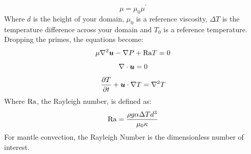 \begin{equation*}
\mu = \mu_{0} \mu^\prime
\end{equation*}
Where $d$ is the height of your domain, $\mu_{0}$ is a reference viscosity, $\Delta T$ is the temperature difference across your domain and $T_{0}$ is a reference temperature. Dropping the primes, the equations become:
\begin{equation}\label{squareconv1}
\mu \nabla^{2} {\mbox{\boldmath$u$}} - \nabla P + \mathrm{Ra} T = 0
\end{equation}
\begin{equation}\label{squareconv2}
\nabla \cdot {\mbox{\boldmath$u$}} = 0
\end{equation}
\begin{equation}\label{squareconv3}
\frac{\partial T}{\partial t} + {\mbox{\boldmath$u$}} \cdot \nabla T = \nabla^{2} T
\end{equation}
Where $\mathrm{Ra}$, the Rayleigh number, is defined as:
\begin{equation}\label{squareconv4}
\mathrm{Ra} = \frac{\rho g \alpha \Delta T d^{3}}{\mu_{0} \kappa } 
\end{equation}
For mantle convection, the Rayleigh Number is the dimensionless number of interest. 

